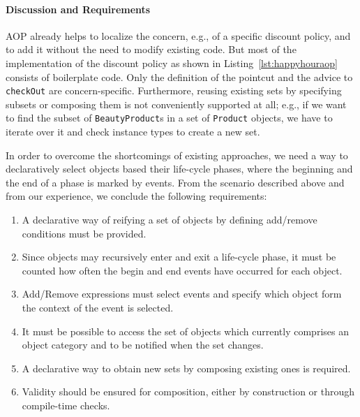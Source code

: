 \paragraph{Discussion and Requirements}

AOP already helps to localize the concern, e.g., of a specific discount policy, and to add it without the need to modify existing code.
But most of the implementation of the discount policy as shown in Listing~\ref{lst:happyhouraop} consists of boilerplate code. Only the definition of the pointcut and the advice to \texttt{checkOut} are concern-specific.
Furthermore, reusing existing sets by specifying subsets or composing them is not conveniently supported at all; e.g., if we want to find the subset of \texttt{BeautyProduct}s in a set of \texttt{Product} objects, we have to iterate over it and check instance types to create a new set.

In order to overcome the shortcomings of existing approaches, we need a way to declaratively select objects based their life-cycle phases, where the beginning and the end of a phase is marked by events. From the scenario described above and from our experience, we conclude the following requirements:

\begin{enumerate}[{Requirement}1{:}]
\item A declarative way of reifying a set of objects by defining add/remove conditions must be provided.
\item Since objects may recursively enter and exit a life-cycle phase, it must be counted how often the begin and end events have occurred for each object.
\item Add/Remove expressions must select events and specify which object form the context of the event is selected.
\item It must be possible to access the set of objects which currently comprises an object category and to be notified when the set changes.
\item A declarative way to obtain new sets by composing existing ones is required.
\item Validity should be ensured for composition, either by construction or through compile-time checks.
\end{enumerate}
